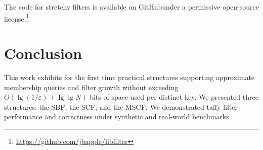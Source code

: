 \documentclass[letterpaper,twocolumn,10pt]{article}
\newcommand{\etal}{et al.}
\newcommand{\taffy}{stretchy}
\newcommand{\TBF}{SBF}
\newcommand{\TCF}{SCF}
\newcommand{\MTCF}{MSCF}
\newcommand{\taffy}{taffy}
\newcommand{\TBF}{TBF}
\newcommand{\TCF}{TCF}
\newcommand{\MTCF}{MTCF}
\begin{document}
\ifanon
\else
The code for \taffy{} filters is available \ifanon\else on GitHub\fi under a permissive open-source license.\ifanon\else\footnote{\url{https://github.com/jbapple/libfilter}}\fi
\fi








\section{Conclusion}
\label{conclusion}

This work exhibits for the first time practical structures supporting approximate membership queries and filter growth without exceeding $O(\lg (1/\varepsilon) + \lg \lg N)$ bits of space used per distinct key.
We presented three structures: the \TBF{}, the \TCF{}, and the \MTCF{}.
We demonstrated taffy filter performance and correctness under synthetic and real-world benchmarks. %



\end{document}

